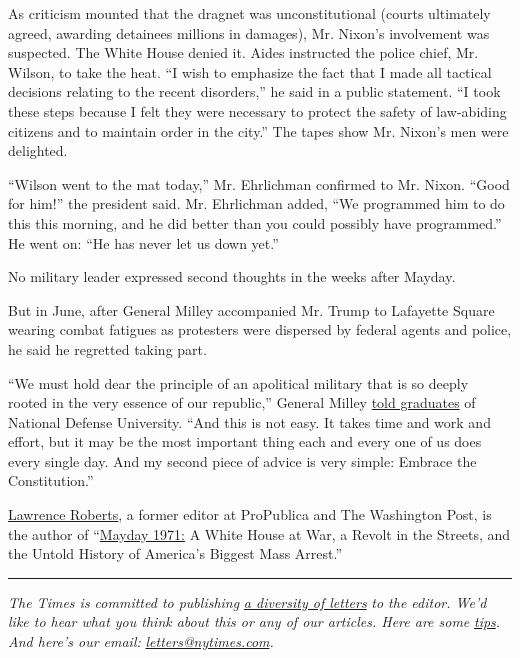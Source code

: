 As criticism mounted that the dragnet was unconstitutional (courts
ultimately agreed, awarding detainees millions in damages), Mr. Nixon's
involvement was suspected. The White House denied it. Aides instructed
the police chief, Mr. Wilson, to take the heat. ``I wish to emphasize
the fact that I made all tactical decisions relating to the recent
disorders,'' he said in a public statement. ``I took these steps because
I felt they were necessary to protect the safety of law-abiding citizens
and to maintain order in the city.'' The tapes show Mr. Nixon's men were
delighted.

``Wilson went to the mat today,'' Mr. Ehrlichman confirmed to Mr. Nixon.
``Good for him!'' the president said. Mr. Ehrlichman added, ``We
programmed him to do this this morning, and he did better than you could
possibly have programmed.'' He went on: ``He has never let us down
yet.''

No military leader expressed second thoughts in the weeks after Mayday.

But in June, after General Milley accompanied Mr. Trump to Lafayette
Square wearing combat fatigues as protesters were dispersed by federal
agents and police, he said he regretted taking part.

``We must hold dear the principle of an apolitical military that is so
deeply rooted in the very essence of our republic,'' General Milley
\href{https://www.youtube.com/watch?v=7AKmmApwi0M}{told graduates} of
National Defense University. ``And this is not easy. It takes time and
work and effort, but it may be the most important thing each and every
one of us does every single day. And my second piece of advice is very
simple: Embrace the Constitution.''

\href{http://www.lawrenceproberts.com/}{Lawrence Roberts}, a former
editor at ProPublica and The Washington Post, is the author of
``\href{https://www.hmhco.com/shop/books/mayday-1971/9781328766724}{Mayday
1971:} A White House at War, a Revolt in the Streets, and the Untold
History of America's Biggest Mass Arrest.''

\begin{center}\rule{0.5\linewidth}{\linethickness}\end{center}

\emph{The Times is committed to publishing}
\href{https://www.nytimes.com/2019/01/31/opinion/letters/letters-to-editor-new-york-times-women.html}{\emph{a
diversity of letters}} \emph{to the editor. We'd like to hear what you
think about this or any of our articles. Here are some}
\href{https://help.nytimes.com/hc/en-us/articles/115014925288-How-to-submit-a-letter-to-the-editor}{\emph{tips}}\emph{.
And here's our email:}
\href{mailto:letters@nytimes.com}{\emph{letters@nytimes.com}}\emph{.}

